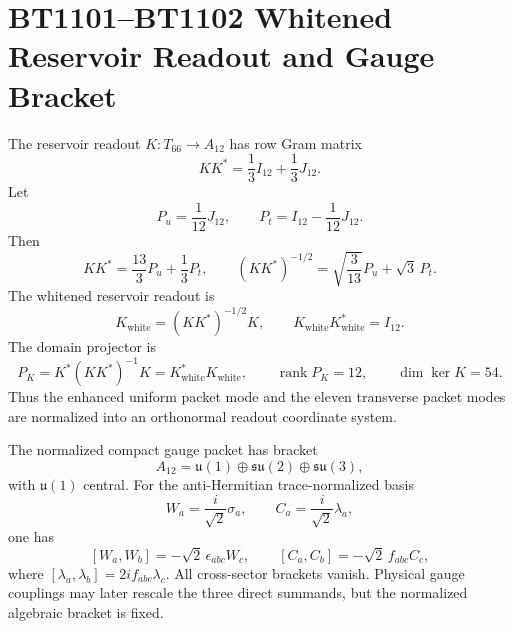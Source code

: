 \section{BT1101--BT1102 Whitened Reservoir Readout and Gauge Bracket}
\label{sec:bt1101-bt1102-whitening-structure}

The reservoir readout $K:T_{66}\to A_{12}$ has row Gram matrix
\[
KK^*=\frac13 I_{12}+\frac13 J_{12}.
\]
Let
\[
P_u=\frac1{12}J_{12},
\qquad
P_t=I_{12}-\frac1{12}J_{12}.
\]
Then
\[
KK^*=\frac{13}{3}P_u+\frac13P_t,
\qquad
(KK^*)^{-1/2}=\sqrt{\frac3{13}}P_u+\sqrt3\,P_t.
\]
The whitened reservoir readout is
\[
K_{\mathrm{white}}=(KK^*)^{-1/2}K,
\qquad
K_{\mathrm{white}}K_{\mathrm{white}}^*=I_{12}.
\]
The domain projector is
\[
P_K=K^*(KK^*)^{-1}K=K_{\mathrm{white}}^*K_{\mathrm{white}},
\qquad
\operatorname{rank}P_K=12,
\qquad
\dim\ker K=54.
\]
Thus the enhanced uniform packet mode and the eleven transverse packet modes are normalized into an orthonormal readout coordinate system.

The normalized compact gauge packet has bracket
\[
A_{12}=\mathfrak u(1)\oplus\mathfrak{su}(2)\oplus\mathfrak{su}(3),
\]
with $\mathfrak u(1)$ central.  For the anti-Hermitian trace-normalized basis
\[
W_a=\frac{i}{\sqrt2}\sigma_a,
\qquad
C_a=\frac{i}{\sqrt2}\lambda_a,
\]
one has
\[
[W_a,W_b]=-\sqrt2\,\epsilon_{abc}W_c,
\qquad
[C_a,C_b]=-\sqrt2\,f_{abc}C_c,
\]
where $[\lambda_a,\lambda_b]=2i f_{abc}\lambda_c$.  All cross-sector brackets vanish.  Physical gauge couplings may later rescale the three direct summands, but the normalized algebraic bracket is fixed.
